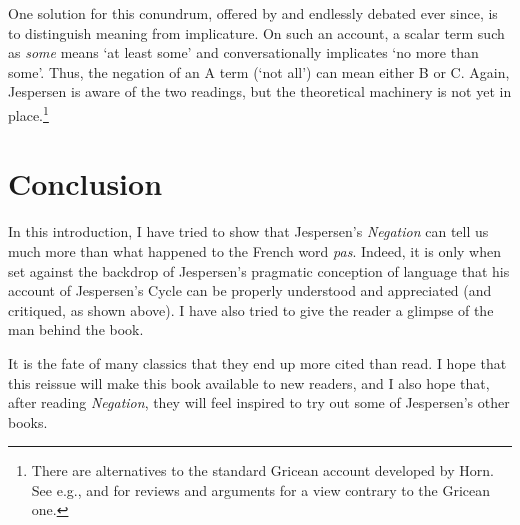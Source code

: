 \documentclass[output=chapter]{langscibook}
\begin{document}
One solution for this conundrum, offered by \citet{Horn1972,Horn1989} and endlessly debated ever since, is to distinguish meaning from implicature. On such an account, a scalar term such as \textit{some} means `at least some' and conversationally implicates `no more than some'. Thus, the negation of an A term (`not all') can mean either B or C. Again, Jespersen is aware of the two readings, but the theoretical machinery is not yet in place.\footnote{There are %
alternatives to the standard Gricean account developed by Horn. See e.g., \citet{Chierchia2017} and \citet{Sauerland2012} for reviews and arguments for a view contrary to the Gricean one.}

\section{Conclusion}

In this introduction, I have tried to show that Jespersen's \textit{Negation} can tell us much more than what happened to the French word \textit{pas}. Indeed, it is only when set against the backdrop of Jespersen's pragmatic conception of language that his account of Jespersen's Cycle can be properly understood and appreciated (and critiqued, as shown above). I have also tried to give the reader a glimpse of the man behind the book.

It is the fate of many classics that they end up more cited than read. I hope that this reissue will make this book available to new readers, and I also hope that, after reading \textit{Negation}, they will feel inspired to try out some of Jespersen's other books.

\printbibliography[heading=subbibliography]
\end{document}
